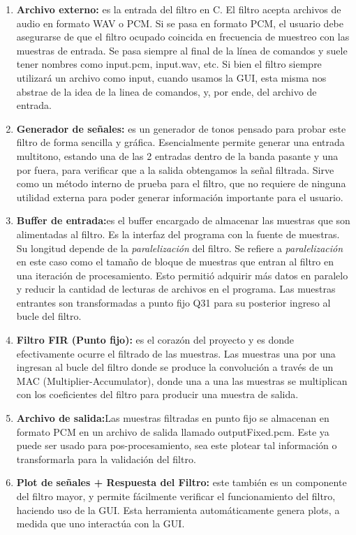 \documentclass[a4,11pt]{article}
\begin{document}
\begin{enumerate}
\begin{enumerate}
\item \textbf{Archivo externo:} es la entrada del filtro en C. El filtro acepta archivos de audio en formato WAV o PCM. Si se pasa en formato PCM, el usuario debe asegurarse de que el filtro ocupado coincida en frecuencia de muestreo con las muestras de entrada. Se pasa siempre al final de la línea de comandos y suele tener nombres como input.pcm, input.wav, etc. Si bien el filtro siempre utilizará un archivo como input, cuando usamos la GUI, esta misma nos abstrae de la idea de la linea de comandos, y, por ende, del archivo de entrada.
\item \textbf{Generador de señales:} es un generador de tonos pensado para probar este filtro de forma sencilla y gráfica. Esencialmente permite generar una entrada multitono, estando una de las 2 entradas dentro de la banda pasante y una por fuera, para verificar que a la salida obtengamos la señal filtrada. Sirve como un método interno de prueba para el filtro, que no requiere de ninguna utilidad externa para poder generar información importante para el usuario.
\item \textbf{Buffer de entrada:}es el buffer encargado de almacenar las muestras que son alimentadas al filtro. Es la interfaz del programa con la fuente de muestras. Su longitud depende de la \textit{paralelización} del filtro. Se refiere a \textit{paralelización} en este caso como el tamaño de bloque de muestras que entran al filtro en una iteración de procesamiento. Esto permitió adquirir más datos en paralelo y reducir la cantidad de lecturas de archivos en el programa. Las muestras entrantes son transformadas a punto fijo Q31 para su posterior ingreso al bucle del filtro.
\item \textbf{Filtro FIR (Punto fijo):} es el corazón del proyecto y es donde efectivamente ocurre el filtrado de las muestras. Las muestras una por una ingresan al bucle del filtro donde se produce la convolución a través de un MAC (Multiplier-Accumulator), donde una a una las muestras se multiplican con los coeficientes del filtro para producir una muestra de salida.
\item \textbf{Archivo de salida:}Las muestras filtradas en punto fijo se almacenan en formato PCM en un archivo de salida llamado outputFixed.pcm. Este ya puede ser usado para pos-procesamiento, sea este plotear tal información o transformarla para la validación del filtro.
\item \textbf{Plot de señales + Respuesta del Filtro:} este también es un componente del filtro mayor, y permite fácilmente verificar el funcionamiento del filtro, haciendo uso de la GUI. Esta herramienta automáticamente genera plots, a medida que uno interactúa con la GUI.
\end{enumerate}


\end{enumerate}
\end{document}
